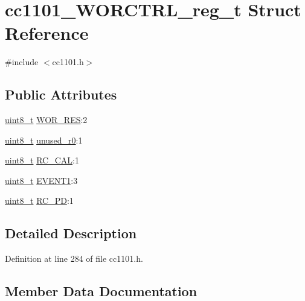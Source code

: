 \hypertarget{structcc1101___w_o_r_c_t_r_l__reg__t}{}\section{cc1101\+\_\+\+W\+O\+R\+C\+T\+R\+L\+\_\+reg\+\_\+t Struct Reference}
\label{structcc1101___w_o_r_c_t_r_l__reg__t}


{\ttfamily \#include $<$cc1101.\+h$>$}

\subsection*{Public Attributes}
\begin{DoxyCompactItemize}
\item 
\hyperlink{_p_e___types_8h_aba7bc1797add20fe3efdf37ced1182c5}{uint8\+\_\+t} \hyperlink{structcc1101___w_o_r_c_t_r_l__reg__t_ad398cc4e8223ed99e737a78b7420cdaa}{W\+O\+R\+\_\+\+R\+ES}\+:2
\item 
\hyperlink{_p_e___types_8h_aba7bc1797add20fe3efdf37ced1182c5}{uint8\+\_\+t} \hyperlink{structcc1101___w_o_r_c_t_r_l__reg__t_a88ce5e1df88de87cf36722325df4fa1f}{unused\+\_\+r0}\+:1
\item 
\hyperlink{_p_e___types_8h_aba7bc1797add20fe3efdf37ced1182c5}{uint8\+\_\+t} \hyperlink{structcc1101___w_o_r_c_t_r_l__reg__t_af7c4a5fe6c7d7e8e8176bc179261f4f8}{R\+C\+\_\+\+C\+AL}\+:1
\item 
\hyperlink{_p_e___types_8h_aba7bc1797add20fe3efdf37ced1182c5}{uint8\+\_\+t} \hyperlink{structcc1101___w_o_r_c_t_r_l__reg__t_a06ea8240b2894184fafa3876ff5962e5}{E\+V\+E\+N\+T1}\+:3
\item 
\hyperlink{_p_e___types_8h_aba7bc1797add20fe3efdf37ced1182c5}{uint8\+\_\+t} \hyperlink{structcc1101___w_o_r_c_t_r_l__reg__t_af3fe5e70d0427d1dbcb455a8c989c2d6}{R\+C\+\_\+\+PD}\+:1
\end{DoxyCompactItemize}


\subsection{Detailed Description}


Definition at line 284 of file cc1101.\+h.



\subsection{Member Data Documentation}
